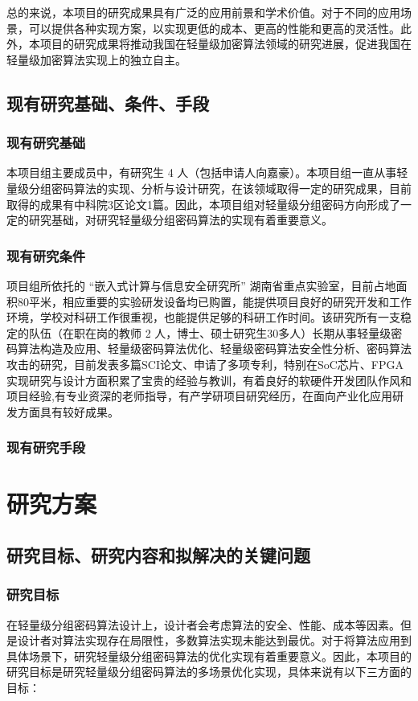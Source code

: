 \documentclass{ctexart}
\begin{document}
总的来说，本项目的研究成果具有广泛的应用前景和学术价值。对于不同的应用场景，可以提供各种实现方案，以实现更低的成本、更高的性能和更高的灵活性。此外，本项目的研究成果将推动我国在轻量级加密算法领域的研究进展，促进我国在轻量级加密算法实现上的独立自主。

\subsection{现有研究基础、条件、手段}
\subsubsection{现有研究基础}
本项目组主要成员中，有研究生 4 人（包括申请人向嘉豪）。本项目组一直从事轻量级分组密码算法的实现、分析与设计研究，在该领域取得一定的研究成果，目前取得的成果有中科院3区论文1篇。因此，本项目组对轻量级分组密码方向形成了一定的研究基础，对研究轻量级分组密码算法的实现有着重要意义。
\subsubsection{现有研究条件}
项目组所依托的 “嵌入式计算与信息安全研究所” 湖南省重点实验室，目前占地面积80平米，相应重要的实验研发设备均已购置，能提供项目良好的研究开发和工作环境，学校对科研工作很重视，也能提供足够的科研工作时间。该研究所有一支稳定的队伍（在职在岗的教师 2 人，博士、硕士研究生30多人）长期从事轻量级密码算法构造及应用、轻量级密码算法优化、轻量级密码算法安全性分析、密码算法攻击的研究，目前发表多篇SCI论文、申请了多项专利，特别在SoC芯片、FPGA实现研究与设计方面积累了宝贵的经验与教训，有着良好的软硬件开发团队作风和项目经验,有专业资深的老师指导，有产学研项目研究经历，在面向产业化应用研发方面具有较好成果。

\subsubsection{现有研究手段}


\section{研究方案}
\subsection{研究目标、研究内容和拟解决的关键问题}
\subsubsection{研究目标}
在轻量级分组密码算法设计上，设计者会考虑算法的安全、性能、成本等因素。但是设计者对算法实现存在局限性，多数算法实现未能达到最优。对于将算法应用到具体场景下，研究轻量级分组密码算法的优化实现有着重要意义。因此，本项目的研究目标是研究轻量级分组密码算法的多场景优化实现，具体来说有以下三方面的目标：
\end{document}
